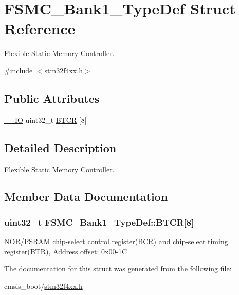 \hypertarget{struct_f_s_m_c___bank1___type_def}{}\section{F\+S\+M\+C\+\_\+\+Bank1\+\_\+\+Type\+Def Struct Reference}
\label{struct_f_s_m_c___bank1___type_def}


Flexible Static Memory Controller.  




{\ttfamily \#include $<$stm32f4xx.\+h$>$}

\subsection*{Public Attributes}
\begin{DoxyCompactItemize}
\item 
\hyperlink{core__cm4_8h_aec43007d9998a0a0e01faede4133d6be}{\+\_\+\+\_\+\+IO} uint32\+\_\+t \hyperlink{struct_f_s_m_c___bank1___type_def_a6d3aefd66a99e71ae4a22444a507a720}{B\+T\+CR} \mbox{[}8\mbox{]}
\end{DoxyCompactItemize}


\subsection{Detailed Description}
Flexible Static Memory Controller. 

\subsection{Member Data Documentation}
\subsubsection[{\texorpdfstring{B\+T\+CR}{BTCR}}]{ uint32\+\_\+t F\+S\+M\+C\+\_\+\+Bank1\+\_\+\+Type\+Def\+::\+B\+T\+CR\mbox{[}8\mbox{]}}\hypertarget{struct_f_s_m_c___bank1___type_def_a6d3aefd66a99e71ae4a22444a507a720}{}\label{struct_f_s_m_c___bank1___type_def_a6d3aefd66a99e71ae4a22444a507a720}
N\+O\+R/\+P\+S\+R\+AM chip-\/select control register(\+B\+C\+R) and chip-\/select timing register(\+B\+T\+R), Address offset\+: 0x00-\/1C 

The documentation for this struct was generated from the following file\+:\begin{DoxyCompactItemize}
\item 
cmsis\+\_\+boot/\hyperlink{stm32f4xx_8h}{stm32f4xx.\+h}\end{DoxyCompactItemize}
